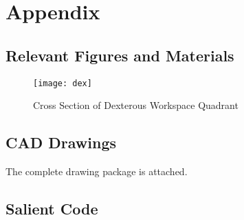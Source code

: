 \newpage
\appendix
\renewcommand\thesection{\Roman{section}}
\renewcommand\thesubsection{\roman{subsection}}
\section{Appendix}\label{sec:app}
\subsection{Relevant Figures and Materials}
\begin{figure}[htp]
  \centering
  \texttt{[image: dex]}
  \caption{Cross Section of Dexterous Workspace Quadrant}
  \label{fig:dex}
\end{figure}
\subsection{CAD Drawings}
The complete drawing package is attached.

\subsection{Salient Code}

\vspace{10ex}


\vspace{10ex}


\vspace{10ex}

% 


